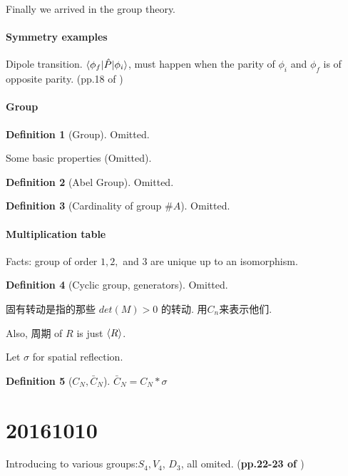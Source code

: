 \documentclass{article}
\numberwithin{equation}{subsection} %
\theoremstyle{definition}
\newtheorem{defi}{Definition}[section]
\begin{document}
Finally we arrived in the group theory.
\paragraph{Symmetry examples} Dipole transition. 
$\braket{\phi_f|\hat{P}|\phi_i}$, must happen when the parity of $\phi_i$
and $\phi_f$ is of opposite parity. (pp.18 of \cite{book})

\paragraph{Group}
\begin{defi}[Group]
    Omitted.
\end{defi}
Some basic properties (Omitted).
\begin{defi}[Abel Group]
    Omitted.
\end{defi}
\begin{defi}[Cardinality of group $\# A$]
    Omitted.
\end{defi}

\paragraph{Multiplication table}

Facts: group of order $1,2,$ and $3$ are unique up to an isomorphism.

\begin{defi}[Cyclic group, generators]
    Omitted.
\end{defi}

\begin{CJK}{UTF8}{gbsn}
固有转动是指的那些 $det(M)>0$ 的转动. 用$C_n$来表示他们.

Also, 周期 of $R$ is just $\braket{R}$.
\end{CJK}

Let $\sigma$ for spatial reflection.
\begin{defi}[$C_N,\bar{C}_N$]
    $\bar{C}_N=C_N*\sigma$
\end{defi}
\section{20161010}
\label{sec:20161010}
Introducing to various groups:$S_4, V_4$, $D_3$, all omited.
(\textbf{pp.22-23 of \cite{book}})
\end{document}
